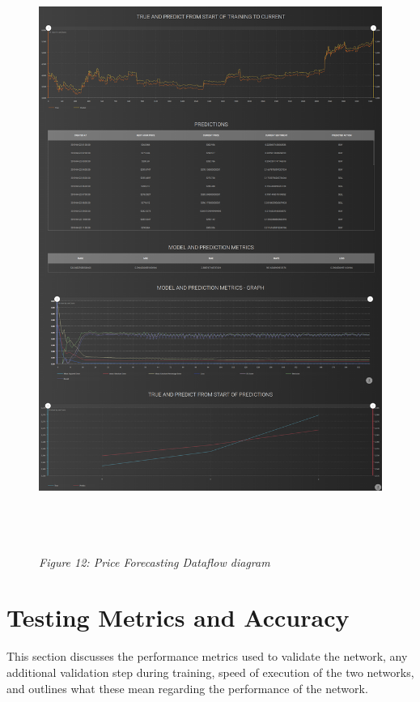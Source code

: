 \documentclass[oneside, 12pt]{article}
\begin{document}
		\begin{figure}[hbt!]
			\centering
			\includegraphics[width=14cm,height=19cm]{images/final_interface.png}
			\begin{center}
				\textit{Figure 12: Price Forecasting Dataflow diagram}
			\end{center}
		\end{figure}
		
	\newpage
	
	\section{Testing Metrics and Accuracy}
	This section discusses the performance metrics used to validate the network, any additional validation step during training, speed of execution of the two networks, and outlines what these mean regarding the performance of the network. 
	
\end{document}
